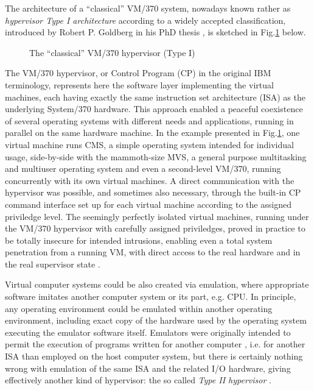 \documentclass[11pt,a4paper]{llncs}
\begin{document}
The architecture of a ``classical'' VM/370 system, nowadays known rather as 
{\em hypervisor Type I architecture} according to a widely accepted 
classification, introduced by Robert P. Goldberg in his PhD thesis 
\cite{Goldberg}, is sketched in Fig.\ref{vm370} below. 
\begin{figure}[h] 
\begin{center} 
\end{center} 
\caption{The ``classical'' VM/370 hypervisor (Type I)} 
\label{vm370} 
\end{figure} 
The VM/370 hypervisor, or Control Program (CP) in the original IBM 
terminology, represents here the software layer implementing the virtual 
machines, each having exactly the same instruction set architecture (ISA) 
as the underlying System/370 hardware. 
This approach enabled a peaceful coexistence of several operating
systems with different needs and applications, running in parallel on the 
same hardware machine.
In the example presented in Fig.\ref{vm370}, one virtual machine runs CMS,
a simple operating system intended for individual usage, side-by-side with 
the mammoth-size MVS, a general purpose multitasking and multiuser operating 
system and even a second-level VM/370, running concurrently with its own 
virtual machines. 
A direct communication with the hypervisor was possible, and sometimes also
necessary, through the built-in CP command interface set up for each virtual
machine according to the assigned priviledge level.
The seemingly perfectly isolated virtual machines, running under the VM/370
hypervisor with carefully assigned priviledges, proved in practice to be 
totally insecure for intended intrusions, enabling even a total system 
penetration from a running VM, with direct access to the real hardware
and in the real supervisor state \cite{IBMSJ15_102}. 


Virtual computer systems could be also created via emulation, where appropriate
software imitates another computer system or its part, e.g. CPU. In principle,
any operating environment could be emulated within another operating 
environment, including exact copy of the hardware used by the operating
system executing the emulator software itself. 
Emulators were originally intended to permit the execution of programs written
for another computer \cite{HoneywellCompJ6_287}, i.e. for another ISA than
employed on the host computer system, but there is certainly nothing wrong
with emulation of the same ISA and the related I/O hardware, giving
effectively another kind of hypervisor: the so called {\em Type II hypervisor}
\cite{Goldberg}.
\end{document}
